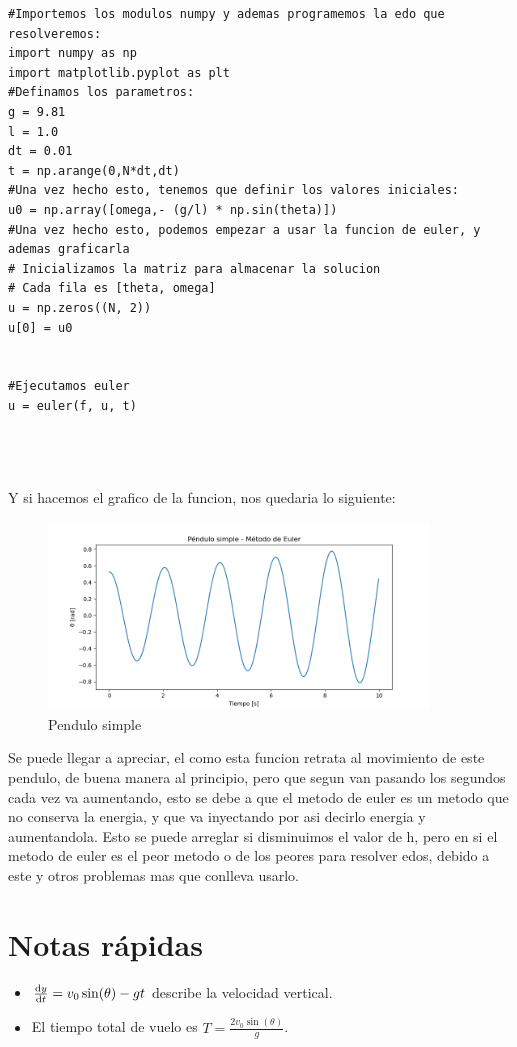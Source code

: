 \documentclass[11pt,a4paper]{article}
\begin{document}
\begin{lstlisting}[caption={Definamos la funcion y todos los parametros}]
#Importemos los modulos numpy y ademas programemos la edo que resolveremos:
import numpy as np
import matplotlib.pyplot as plt
#Definamos los parametros:
g = 9.81
l = 1.0
dt = 0.01
t = np.arange(0,N*dt,dt)
#Una vez hecho esto, tenemos que definir los valores iniciales:
u0 = np.array([omega,- (g/l) * np.sin(theta)])
#Una vez hecho esto, podemos empezar a usar la funcion de euler, y ademas graficarla
# Inicializamos la matriz para almacenar la solucion
# Cada fila es [theta, omega]
u = np.zeros((N, 2))
u[0] = u0


#Ejecutamos euler
u = euler(f, u, t)




\end{lstlisting}

Y si hacemos el grafico de la funcion, nos quedaria lo siguiente:

\begin{figure}[h]  %
    \centering
    \includegraphics[width=0.9\textwidth]{img/Figure_1.png}  %
    \caption{Pendulo simple}
    \label{fig:Pendulo_Simple}
\end{figure}

Se puede llegar a apreciar, el como esta funcion retrata al movimiento de este pendulo, de buena manera al principio, pero que segun van pasando los segundos cada vez va aumentando, esto se debe a que el metodo de euler es un metodo que no conserva la energia, y que va inyectando por asi decirlo energia y aumentandola. Esto se puede arreglar si disminuimos el valor de h, pero en si el metodo de euler es el peor metodo o de los peores para resolver edos, debido a este y otros problemas mas que conlleva usarlo.








\section*{Notas rápidas}
\begin{itemize}
    \item $\dv{y}{t} = v_0 \sin(\theta) - g t$ describe la velocidad vertical.
    \item El tiempo total de vuelo es $T = \frac{2v_0\sin(\theta)}{g}$.
\end{itemize}
\end{document}
